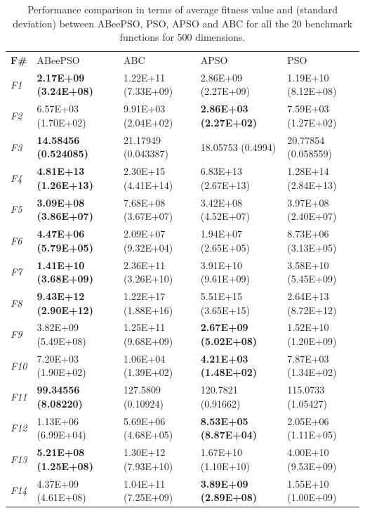 \begin{table}[!h]
\caption{\small{Performance comparison in terms of average fitness value and (standard deviation) between ABeePSO, PSO, APSO and ABC for all the 20 benchmark functions for 500 dimensions.}}
\label{tab:Comparison_500D}
\begin{center}
\begin{tabular}{p{0.5cm}|p{2.5cm}|p{2.5cm}|p{2.5cm}|p{2.5cm}}
\hline\noalign{\smallskip}
\textbf{F\#}	& ABeePSO & ABC & APSO & PSO    \\		
\noalign{\smallskip}
\hline
\noalign{\smallskip}
\textit{F1}	& \textbf{2.17E+09 (3.24E+08)} & 1.22E+11 (7.33E+09) & 2.86E+09 (2.27E+09) & 1.19E+10 (8.12E+08)\\		
\textit{F2}	& 6.57E+03 (1.70E+02) & 9.91E+03 (2.04E+02) & \textbf{2.86E+03 (2.27E+02)} & 7.59E+03 (1.27E+02)\\		
\textit{F3}	& \textbf{14.58456 (0.524085)} & 21.17949 (0.043387) & 18.05753 (0.4994) & 20.77854 (0.058559) \\
\textit{F4} & \textbf{4.81E+13 (1.26E+13)} & 2.30E+15 (4.41E+14) & 6.83E+13 (2.67E+13) & 1.28E+14 (2.84E+13)\\		
\textit{F5} & \textbf{3.09E+08 (3.86E+07)} & 7.68E+08 (3.67E+07) & 3.42E+08 (4.52E+07) & 3.97E+08 (2.40E+07)\\
\textit{F6} & \textbf{4.47E+06 (5.79E+05)} & 2.09E+07 (9.32E+04) & 1.94E+07 (2.65E+05) & 8.73E+06 (3.13E+05)\\
\textit{F7} & \textbf{1.41E+10 (3.68E+09)} & 2.36E+11 (3.26E+10) & 3.91E+10 (9.61E+09) & 3.58E+10 (5.45E+09)\\
\textit{F8} & \textbf{9.43E+12 (2.90E+12)} & 1.22E+17 (1.88E+16) & 5.51E+15 (3.65E+15) & 2.64E+13 (8.72E+12)\\
\textit{F9} & 3.82E+09 (5.49E+08) & 1.25E+11 (9.68E+09) & \textbf{2.67E+09 (5.02E+08)} & 1.52E+10 (1.20E+09)\\
\textit{F10}& 7.20E+03 (1.90E+02) & 1.06E+04 (1.39E+02) & \textbf{4.21E+03 (1.48E+02)} & 7.87E+03 (1.34E+02)\\
\textit{F11}& \textbf{99.34556 (8.08220)} & 127.5809 (0.10924) & 120.7821 (0.91662) & 115.0733 (1.05427) \\
\textit{F12}& 1.13E+06 (6.99E+04) & 5.69E+06 (4.68E+05) & \textbf{8.53E+05 (8.87E+04)} & 2.05E+06 (1.11E+05)\\
\textit{F13}& \textbf{5.21E+08 (1.25E+08)} & 1.30E+12 (7.93E+10) & 1.67E+10 (1.10E+10) & 4.00E+10 (9.53E+09)\\
\textit{F14}& 4.37E+09 (4.61E+08) & 1.04E+11 (7.25E+09) & \textbf{3.89E+09 (2.89E+08)} & 1.55E+10 (1.00E+09)\\

\end{tabular}
\end{center}
\end{table}
